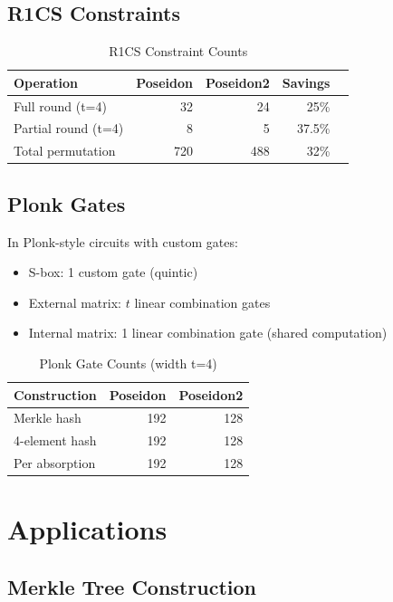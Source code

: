 \documentclass[11pt,a4paper]{article}
\begin{document}
\subsection{R1CS Constraints}

\begin{table}[htbp]
\centering
\caption{R1CS Constraint Counts}
\label{tab:r1cs}
\begin{tabular}{@{}lrrrr@{}}
\toprule
Operation & Poseidon & Poseidon2 & Savings \\
\midrule
Full round (t=4) & 32 & 24 & 25\% \\
Partial round (t=4) & 8 & 5 & 37.5\% \\
Total permutation & 720 & 488 & 32\% \\
\bottomrule
\end{tabular}
\end{table}

\subsection{Plonk Gates}

In Plonk-style circuits with custom gates:

\begin{itemize}
    \item S-box: 1 custom gate (quintic)
    \item External matrix: $t$ linear combination gates
    \item Internal matrix: 1 linear combination gate (shared computation)
\end{itemize}

\begin{table}[htbp]
\centering
\caption{Plonk Gate Counts (width t=4)}
\label{tab:plonk}
\begin{tabular}{@{}lrr@{}}
\toprule
Construction & Poseidon & Poseidon2 \\
\midrule
Merkle hash & 192 & 128 \\
4-element hash & 192 & 128 \\
Per absorption & 192 & 128 \\
\bottomrule
\end{tabular}
\end{table}

\section{Applications}

\subsection{Merkle Tree Construction}
\end{document}
